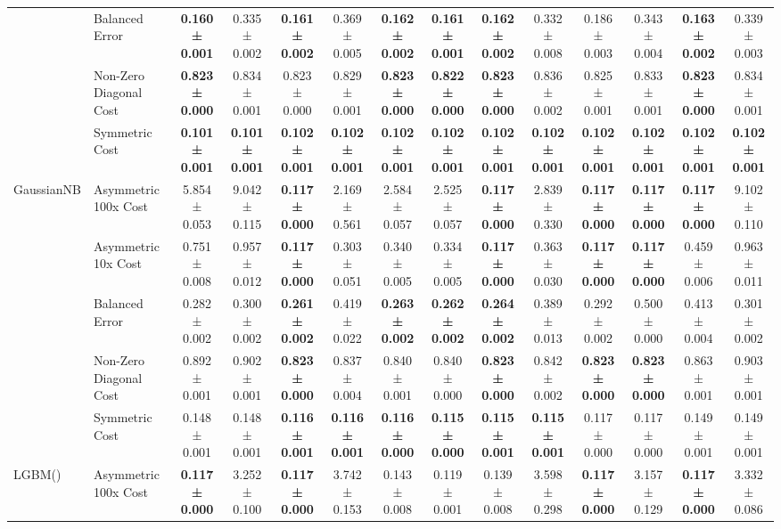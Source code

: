 \begin{table}[H]
{\begin{tabular}{llcccccccccccc}
 & Balanced Error & \textbf{0.160 ± 0.001} & 0.335 ± 0.002 & \textbf{0.161 ± 0.002} & 0.369 ± 0.005 & \textbf{0.162 ± 0.002} & \textbf{0.161 ± 0.001} & \textbf{0.162 ± 0.002} & 0.332 ± 0.008 & 0.186 ± 0.003 & 0.343 ± 0.004 & \textbf{0.163 ± 0.002} & 0.339 ± 0.003 \\
 & Non-Zero Diagonal Cost & \textbf{0.823 ± 0.000} & 0.834 ± 0.001 & 0.823 ± 0.000 & 0.829 ± 0.001 & \textbf{0.823 ± 0.000} & \textbf{0.822 ± 0.000} & \textbf{0.823 ± 0.000} & 0.836 ± 0.002 & 0.825 ± 0.001 & 0.833 ± 0.001 & \textbf{0.823 ± 0.000} & 0.834 ± 0.001 \\
 & Symmetric Cost & \textbf{0.101 ± 0.001} & \textbf{0.101 ± 0.001} & \textbf{0.102 ± 0.001} & \textbf{0.102 ± 0.001} & \textbf{0.102 ± 0.001} & \textbf{0.102 ± 0.001} & \textbf{0.102 ± 0.001} & \textbf{0.102 ± 0.001} & \textbf{0.102 ± 0.001} & \textbf{0.102 ± 0.001} & \textbf{0.102 ± 0.001} & \textbf{0.102 ± 0.001} \\
\cline{1-14}
\multirow[t]{5}{*}{GaussianNB} & Asymmetric 100x Cost & 5.854 ± 0.053 & 9.042 ± 0.115 & \textbf{0.117 ± 0.000} & 2.169 ± 0.561 & 2.584 ± 0.057 & 2.525 ± 0.057 & \textbf{0.117 ± 0.000} & 2.839 ± 0.330 & \textbf{0.117 ± 0.000} & \textbf{0.117 ± 0.000} & \textbf{0.117 ± 0.000} & 9.102 ± 0.110 \\
 & Asymmetric 10x Cost & 0.751 ± 0.008 & 0.957 ± 0.012 & \textbf{0.117 ± 0.000} & 0.303 ± 0.051 & 0.340 ± 0.005 & 0.334 ± 0.005 & \textbf{0.117 ± 0.000} & 0.363 ± 0.030 & \textbf{0.117 ± 0.000} & \textbf{0.117 ± 0.000} & 0.459 ± 0.006 & 0.963 ± 0.011 \\
 & Balanced Error & 0.282 ± 0.002 & 0.300 ± 0.002 & \textbf{0.261 ± 0.002} & 0.419 ± 0.022 & \textbf{0.263 ± 0.002} & \textbf{0.262 ± 0.002} & \textbf{0.264 ± 0.002} & 0.389 ± 0.013 & 0.292 ± 0.002 & 0.500 ± 0.000 & 0.413 ± 0.004 & 0.301 ± 0.002 \\
 & Non-Zero Diagonal Cost & 0.892 ± 0.001 & 0.902 ± 0.001 & \textbf{0.823 ± 0.000} & 0.837 ± 0.004 & 0.840 ± 0.001 & 0.840 ± 0.000 & \textbf{0.823 ± 0.000} & 0.842 ± 0.002 & \textbf{0.823 ± 0.000} & \textbf{0.823 ± 0.000} & 0.863 ± 0.001 & 0.903 ± 0.001 \\
 & Symmetric Cost & 0.148 ± 0.001 & 0.148 ± 0.001 & \textbf{0.116 ± 0.001} & \textbf{0.116 ± 0.001} & \textbf{0.116 ± 0.000} & \textbf{0.115 ± 0.000} & \textbf{0.115 ± 0.001} & \textbf{0.115 ± 0.001} & 0.117 ± 0.000 & 0.117 ± 0.000 & 0.149 ± 0.001 & 0.149 ± 0.001 \\
\cline{1-14}
\multirow[t]{5}{*}{LGBM()} & Asymmetric 100x Cost & \textbf{0.117 ± 0.000} & 3.252 ± 0.100 & \textbf{0.117 ± 0.000} & 3.742 ± 0.153 & 0.143 ± 0.008 & 0.119 ± 0.001 & 0.139 ± 0.008 & 3.598 ± 0.298 & \textbf{0.117 ± 0.000} & 3.157 ± 0.129 & \textbf{0.117 ± 0.000} & 3.332 ± 0.086 \\

\end{tabular}}
\end{table}
